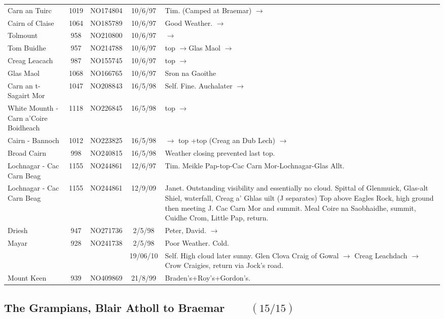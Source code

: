 \documentclass[10pt,a4paper]{article}
\begin{document}
\begin{tabular}{p{3.9cm}cccp{6cm}}
Carn an Tuirc  & 1019 & NO174804 &10/6/97& Tim. (Camped at Braemar) $\rightarrow$  \\
Cairn of Claise  & 1064  & NO185789 &10/6/97& Good Weather. $\rightarrow$  \\
Tolmount & 958  & NO210800 &10/6/97& $\rightarrow$ \\
Tom Buidhe & 957 & NO214788 &10/6/97&top $\rightarrow$Glas Maol $\rightarrow$\\
Creag Leacach & 987  & NO155745 &10/6/97& top $\rightarrow$  \\
Glas Maol  & 1068 & NO166765 &10/6/97& Sron na Gaoithe\\
Carn an t-Sagairt Mor  & 1047 & NO208843&16/5/98& Self. Fine. Auchalater $\rightarrow$ \\
White Mounth - Carn a'Coire Boidheach & 1118  & NO226845 &16/5/98& top $\rightarrow$\\
Cairn - Bannoch  & 1012  & NO223825 &16/5/98&  $\rightarrow$ top +top (Creag an Dub Lech)
 $\rightarrow$  \\
Broad Cairn & 998  & NO240815 &16/5/98& Weather closing prevented last top.\\
Lochnagar - Cac Carn Beag  & 1155  & NO244861 &12/6/97& Tim.
Meikle
Pap-top-Cac Carn Mor-Lochnagar-Glas Allt.\\
        Lochnagar - Cac Carn Beag  & 1155  & NO244861 &12/9/09&Janet. Outstanding visibility
        and essentially no cloud. Spittal of Glenmuick, Glas-alt Shiel, waterfall, Creag a' Ghlas uilt
        (J separates) Top above Eagles Rock, high ground then meeting J. Cac Carn Mor and summit. Meal Coire na
        Saobhaidhe, summit, Cuidhe Crom, Little Pap, return.\\
Driesh & 947  & NO271736 &2/5/98& Peter, David. $\rightarrow$ \\
Mayar & 928  & NO241738 &2/5/98& Poor Weather. Cold.\\
&&&19/06/10&Self. High cloud later sunny. Glen Clova Craig of
Gowal $\rightarrow$ Creag Leachdach $\rightarrow$ Crow Craigies,
return via Jock's road.\\
Mount Keen & 939  & NO409869 &21/8/99& Braden's+Roy's+Gordon's. \\
\end{tabular}

\vspace{0.5in}

\subsection*{The Grampians, Blair Atholl to Braemar $\qquad (15/15)$}
\end{document}
